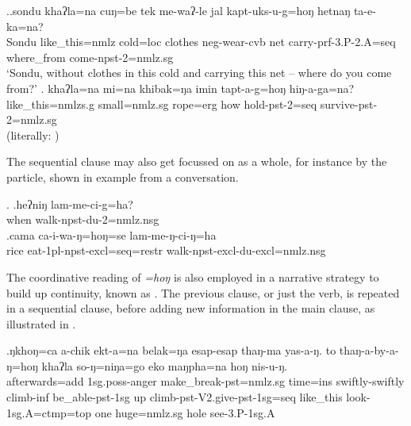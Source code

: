 \ex.\ag.\label{ex_sondu}sondu  khaʔla=na      cuŋ=be  tek   me-waʔ-le  jal kapt-uks-u-g=hoŋ hetnaŋ    ta-e-ka=na?\\
		Sondu like\_this={\sc nmlz} cold={\sc loc} clothes {\sc neg}-wear-{\sc cvb} net carry{\sc -prf-3.P-2.A=seq}  where\_from come{\sc -npst-2=nmlz.sg}\\
		‘Sondu, without clothes in this cold and carrying this net – where do you come from?’ 	
\bg. khaʔla=na          mi=na  khibak=ŋa   imin tapt-a-g=hoŋ          hiŋ-a-ga=na?\\
like\_this{\sc =nmlzs.g} small{\sc =nmlz.sg} rope{\sc =erg} how hold{\sc -pst-2=seq} survive{\sc -pst-2=nmlz.sg} \\
 (literally: ) 

		
The sequential clause may also get focussed on as a whole, for instance by the  particle, shown in example \Next from a conversation. 
		
		\ex. \ag.heʔniŋ lam-me-ci-g=ha?\\
		when walk{\sc -npst-du-2=nmlz.nsg}\\
		\bg.cama ca-i-wa-ŋ=hoŋ=se lam-me-ŋ-ci-ŋ=ha \\
		rice eat{\sc -1pl-npst-excl=seq=restr} walk{\sc -npst-excl-du-excl=nmlz.nsg}\\

	
The coordinative reading of  \emph{=hoŋ} is also employed in a narrative strategy  to build up continuity, known as  \citep[39]{Ebert2003Equivalents}. The previous clause, or just the verb, is repeated in a sequential clause, before adding new information in the main clause, as illustrated in \Next.

\exg.ŋkhoŋ=ca  a-chik ekt-a=na belak=ŋa  esap-esap thaŋ-ma    yas-a-ŋ. to  thaŋ-a-by-a-ŋ=hoŋ khaʔla   so-ŋ=niŋa=go eko maŋpha=na hoŋ nis-u-ŋ.\\
afterwards{\sc =add} {\sc 1sg.poss-}anger make\_break{\sc -pst=nmlz.sg} time{\sc =ins} swiftly-swiftly climb{\sc -inf} be\_able{\sc -pst-1sg} up climb{\sc -pst-V2.give-pst-1sg=seq} like\_this look{\sc [pst]-1sg.A=ctmp=top} one huge{\sc =nmlz.sg} hole see{\sc [pst]-3.P-1sg.A}\\
 

